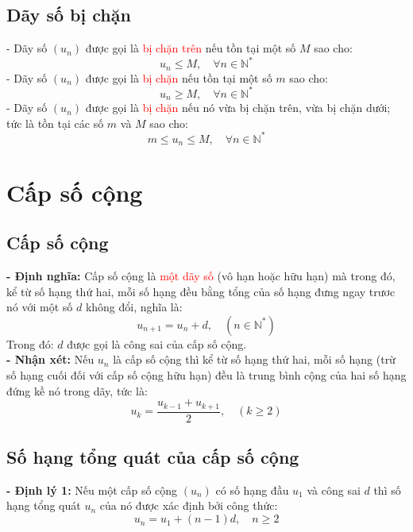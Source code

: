 \subsection{Dãy số bị chặn}
\noindent\hspace*{1cm}- Dãy số $(u_n)$ được gọi là \textcolor{red}{bị chặn trên} nếu tồn tại một số $M$ sao cho:
\[
    \boxed{u_n \leq M, \quad \forall n \in \mathbb{N}^*}
\]
\noindent\hspace*{1cm}- Dãy số $(u_n)$ được gọi là \textcolor{red}{bị chặn } nếu tồn tại một số $m$ sao cho:
\[
    \boxed{u_n \geq M, \quad \forall n \in \mathbb{N}^*}
\]
\noindent\hspace*{1cm}- Dãy số $(u_n)$ được gọi là \textcolor{red}{bị chặn} nếu nó vừa bị chặn trên, vừa bị chặn dưới; tức là tồn tại các số $m$ và $M$ sao cho:
\[
    \boxed{m \leq u_n \leq M, \quad \forall n \in \mathbb{N}^*}
\]

\section{Cấp số cộng}
\subsection{Cấp số cộng}
\noindent\hspace*{1cm}\textbf{- Định nghĩa:} Cấp số cộng là \textcolor{red}{một dãy số} (vô hạn hoặc hữu hạn) mà trong đó, kể từ số hạng thứ hai, mỗi số hạng đều bằng tổng của số hạng đưng ngay trươc nó với một số $d$ không đổi, nghĩa là:
\[
    \boxed{u_{n+1} = u_n + d, \quad (n \in \mathbb{N}^*)}
\]
\noindent\hspace*{1.5cm} Trong đó: $d$ được gọi là công sai của cấp số cộng.\\[6pt]
\noindent\hspace*{1cm}\textbf{- Nhận xét:} Nếu $u_n$ là cấp số cộng thì kể từ số hạng thứ hai, mỗi số hạng (trừ số hạng cuối đối với cấp số cộng hữu hạn) đều là trung bình cộng của hai số hạng đứng kề nó trong dãy, tức là:
\[
	\boxed{u_k = \dfrac{u_{k-1} + u_{k+1}}{2}, \quad (k \geq 2)}
\]

\subsection{Số hạng tổng quát của cấp số cộng}
\noindent\hspace*{1cm}\textbf{- Định lý 1:} Nếu một cấp số cộng $(u_n)$ có số hạng đầu $u_1$ và công sai $d$ thì số hạng tổng quát $u_n$ của nó được xác định bởi công thức:
\[
	\boxed{u_n = u_1 + (n-1)d, \quad n \geq 2}
\]

